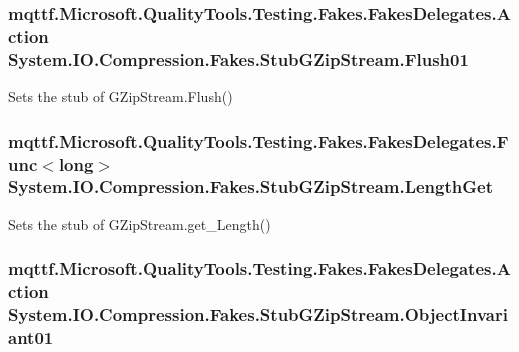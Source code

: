 \hypertarget{class_system_1_1_i_o_1_1_compression_1_1_fakes_1_1_stub_g_zip_stream_a60cb85ad5faacaa0eac080e3a64add5f}{
\subsubsection[{Flush01}]{\setlength{\rightskip}{0pt plus 5cm}mqttf.\-Microsoft.\-Quality\-Tools.\-Testing.\-Fakes.\-Fakes\-Delegates.\-Action System.\-I\-O.\-Compression.\-Fakes.\-Stub\-G\-Zip\-Stream.\-Flush01}}\label{class_system_1_1_i_o_1_1_compression_1_1_fakes_1_1_stub_g_zip_stream_a60cb85ad5faacaa0eac080e3a64add5f}


Sets the stub of G\-Zip\-Stream.\-Flush()

\hypertarget{class_system_1_1_i_o_1_1_compression_1_1_fakes_1_1_stub_g_zip_stream_add376a11dcd192c28887492ab508c382}{
\subsubsection[{Length\-Get}]{\setlength{\rightskip}{0pt plus 5cm}mqttf.\-Microsoft.\-Quality\-Tools.\-Testing.\-Fakes.\-Fakes\-Delegates.\-Func$<$long$>$ System.\-I\-O.\-Compression.\-Fakes.\-Stub\-G\-Zip\-Stream.\-Length\-Get}}\label{class_system_1_1_i_o_1_1_compression_1_1_fakes_1_1_stub_g_zip_stream_add376a11dcd192c28887492ab508c382}


Sets the stub of G\-Zip\-Stream.\-get\-\_\-\-Length()

\hypertarget{class_system_1_1_i_o_1_1_compression_1_1_fakes_1_1_stub_g_zip_stream_ae6a0498cdbe10dab78d4a61fe43d0e63}{
\subsubsection[{Object\-Invariant01}]{\setlength{\rightskip}{0pt plus 5cm}mqttf.\-Microsoft.\-Quality\-Tools.\-Testing.\-Fakes.\-Fakes\-Delegates.\-Action System.\-I\-O.\-Compression.\-Fakes.\-Stub\-G\-Zip\-Stream.\-Object\-Invariant01}}\label{class_system_1_1_i_o_1_1_compression_1_1_fakes_1_1_stub_g_zip_stream_ae6a0498cdbe10dab78d4a61fe43d0e63}


